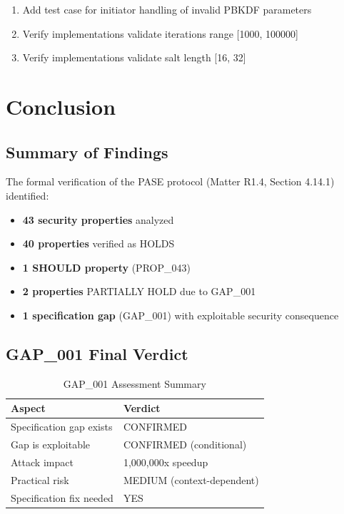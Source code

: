 \documentclass[11pt,a4paper]{article}
\begin{document}
\begin{enumerate}
    \item Add test case for initiator handling of invalid PBKDF parameters
    \item Verify implementations validate iterations range [1000, 100000]
    \item Verify implementations validate salt length [16, 32]
\end{enumerate}

\section{Conclusion}

\subsection{Summary of Findings}

The formal verification of the PASE protocol (Matter R1.4, Section 4.14.1) identified:

\begin{itemize}
    \item \textbf{43 security properties} analyzed
    \item \textbf{40 properties} verified as HOLDS
    \item \textbf{1 SHOULD property} (PROP\_043)
    \item \textbf{2 properties} PARTIALLY HOLD due to GAP\_001
    \item \textbf{1 specification gap} (GAP\_001) with exploitable security consequence
\end{itemize}

\subsection{GAP\_001 Final Verdict}

\begin{table}[H]
\centering
\caption{GAP\_001 Assessment Summary}
\begin{tabular}{|l|l|}
\hline
\rowcolor{lightgray}
\textbf{Aspect} & \textbf{Verdict} \\
\hline
Specification gap exists & \textcolor{successgreen}{CONFIRMED} \\
\hline
Gap is exploitable & \textcolor{successgreen}{CONFIRMED} (conditional) \\
\hline
Attack impact & \textcolor{criticalred}{1,000,000x speedup} \\
\hline
Practical risk & \textcolor{warningorange}{MEDIUM} (context-dependent) \\
\hline
Specification fix needed & \textcolor{successgreen}{YES} \\
\hline
\end{tabular}
\end{table}
\end{document}
